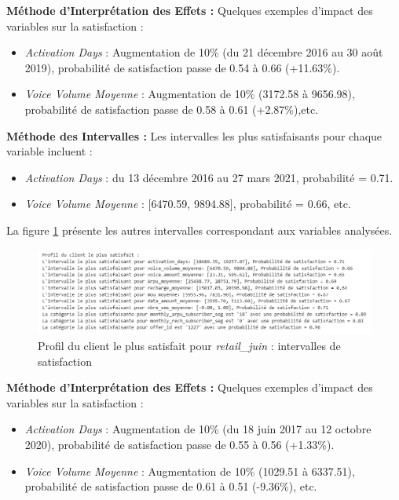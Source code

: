 \textbf{Méthode d'Interprétation des Effets :}
Quelques exemples d'impact des variables sur la satisfaction :
\begin{itemize}
    \item \textit{Activation Days} : Augmentation de 10\% (du 21 décembre 2016 au 30 août 2019), probabilité de satisfaction passe de 0.54 à 0.66 (+11.63\%).
    \item \textit{Voice Volume Moyenne} : Augmentation de 10\% (3172.58 à 9656.98), probabilité de satisfaction passe de 0.58 à 0.61 (+2.87\%),etc.
\end{itemize}

\textbf{Méthode des Intervalles :}  
Les intervalles les plus satisfaisants pour chaque variable incluent :  
\begin{itemize}
    \item \textit{Activation Days} : du 13 décembre 2016 au 27 mars 2021, probabilité = 0.71.
    \item \textit{Voice Volume Moyenne} : [6470.59, 9894.88], probabilité = 0.66, etc.
\end{itemize}
La figure \ref{fig:profil_satisfait_retail} présente les autres intervalles correspondant aux variables analysées.

\begin{figure}[H]
    \centering
    \includegraphics[width=0.9\linewidth]{capture_modele_34.png}
    \caption{Profil du client le plus satisfait pour \textit{retail\_juin} : intervalles de satisfaction}
    \label{fig:profil_satisfait_retail}
\end{figure}

\textbf{Méthode d'Interprétation des Effets :}  
Quelques exemples d'impact des variables sur la satisfaction :  
\begin{itemize}
    \item \textit{Activation Days} : Augmentation de 10\% (du 18 juin 2017 au 12 octobre 2020), probabilité de satisfaction passe de 0.55 à 0.56 (+1.33\%).
    \item \textit{Voice Volume Moyenne} : Augmentation de 10\% (1029.51 à 6337.51), probabilité de satisfaction passe de 0.61 à 0.51 (-9.36\%), etc.
\end{itemize}

